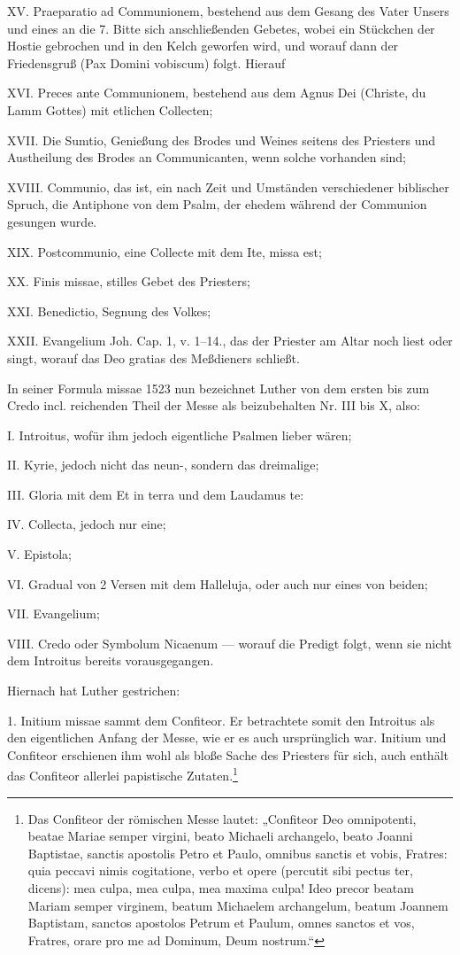 XV. Praeparatio ad Communionem, bestehend aus dem Gesang des Vater Unsers und eines an die 7. Bitte sich anschließenden Gebetes, wobei ein Stückchen der Hostie gebrochen und in den Kelch geworfen wird, und worauf dann der Friedensgruß (Pax Domini vobiscum) folgt. Hierauf

XVI. Preces ante Communionem, bestehend aus dem Agnus Dei (Christe, du Lamm Gottes) mit etlichen Collecten;

XVII. Die Sumtio, Genießung des Brodes und Weines seitens des Priesters und Austheilung des Brodes an Communicanten, wenn solche vorhanden sind;

XVIII. Communio, das ist, ein nach Zeit und Umständen verschiedener biblischer Spruch, die Antiphone von dem Psalm, der ehedem während der Communion gesungen wurde.

XIX. Postcommunio, eine Collecte mit dem Ite, missa est;

XX. Finis missae, stilles Gebet des Priesters;

XXI. Benedictio, Segnung des Volkes;

XXII. Evangelium Joh. Cap. 1, v. 1–14., das der Priester am Altar noch liest oder singt, worauf das Deo gratias des Meßdieners schließt.

In seiner Formula missae 1523 nun bezeichnet Luther von dem ersten bis zum Credo incl. reichenden Theil der Messe als beizubehalten Nr. III bis X, also:

I. Introitus, wofür ihm jedoch eigentliche Psalmen lieber wären;

II. Kyrie, jedoch nicht das neun-, sondern das dreimalige;

III. Gloria mit dem Et in terra und dem Laudamus te:

IV. Collecta, jedoch nur eine;

V. Epistola;

VI. Gradual von 2 Versen mit dem Halleluja, oder auch nur eines von beiden;

VII. Evangelium;

VIII. Credo oder Symbolum Nicaenum — worauf die Predigt folgt, wenn sie nicht dem Introitus bereits vorausgegangen.

Hiernach hat Luther gestrichen:

1. Initium missae sammt dem Confiteor. Er betrachtete somit den Introitus als den eigentlichen Anfang der Messe, wie er es auch ursprünglich war. Initium und Confiteor erschienen ihm wohl als bloße Sache des Priesters für sich, auch enthält das Confiteor allerlei papistische Zutaten.\footnote{Das Confiteor der römischen Messe lautet: „Confiteor Deo omnipotenti, beatae Mariae semper virgini, beato Michaeli archangelo, beato Joanni Baptistae, sanctis apostolis Petro et Paulo, omnibus sanctis et vobis, Fratres: quia peccavi nimis cogitatione, verbo et opere (percutit sibi pectus ter, dicens): mea culpa, mea culpa, mea maxima culpa! Ideo precor beatam Mariam semper virginem, beatum Michaelem archangelum, beatum Joannem Baptistam, sanctos apostolos Petrum et Paulum, omnes sanctos et vos, Fratres, orare pro me ad Dominum, Deum nostrum.“}

